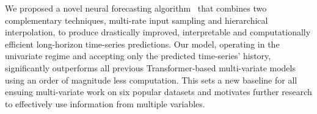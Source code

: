 We proposed a novel neural forecasting algorithm \ours\ that combines two complementary techniques, multi-rate input sampling and hierarchical interpolation, to produce drastically improved, interpretable and computationally efficient long-horizon time-series predictions. Our model, operating in the univariate regime and accepting only the predicted time-series' history, significantly outperforms all previous Transformer-based multi-variate models using an order of magnitude less computation. This sets a new baseline for all ensuing multi-variate work on six popular datasets and motivates further research to effectively use information from multiple variables.

